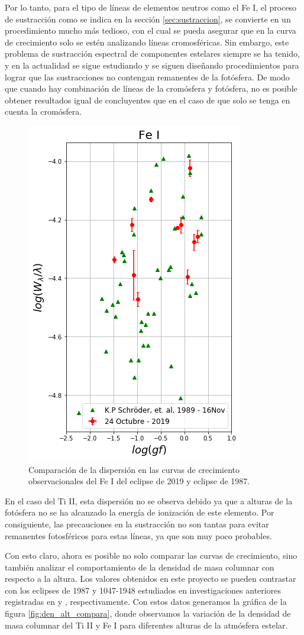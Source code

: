 \documentclass[12pt,oneside,openany,letter]{book}
\begin{document}
Por lo tanto, para el tipo de líneas de elementos neutros como el Fe I, el proceso de sustracción como se indica en la sección \ref{sec:sustraccion}, se convierte en un procedimiento mucho más tedioso, con el cual se pueda asegurar que en la curva de crecimiento solo se estén analizando líneas cromosféricas. Sin embargo, este problema de sustracción espectral de componentes estelares siempre se ha tenido, y en la actualidad se sigue estudiando y se siguen diseñando procedimientos para lograr que las sustracciones no contengan remanentes de la fotósfera. De modo que cuando hay combinación de líneas de la cromósfera y fotósfera, no es posible obtener resultados igual de concluyentes que en el caso de que solo se tenga en cuenta la cromósfera.

\begin{figure}[h]
    \centering
    \includegraphics[width=0.5\linewidth]{Gaficas/Fe_1987.png}
    \caption{Comparación de la dispersión en las curvas de crecimiento observacionales del Fe I del eclipse de 2019 y eclipse de 1987.}
    \label{fig:curvFe_obs}
\end{figure}

En el caso del Ti II, esta dispersión no se observa debido ya que a alturas de la fotósfera no se ha alcanzado la energía de ionización de este elemento. Por consiguiente, las precauciones en la sustracción no son tantas para evitar remanentes fotosféricos para estas líneas, ya que son muy poco probables.

Con esto claro, ahora es posible no solo comparar las curvas de crecimiento, sino también analizar el comportamiento de la densidad de masa columnar con respecto a la altura. Los valores obtenidos en este proyecto se pueden contrastar con los eclipses de 1987 y 1047-1948 estudiados en investigaciones anteriores registradas en \citet{kps1O} y \citet{wilson1954chromospheric}, respectivamente. Con estos datos generamos la gráfica de la figura \ref{fig:den_alt_compara}, donde observamos la variación de la densidad de masa columnar del Ti II y Fe I para diferentes alturas de la atmósfera estelar. 
\end{document}
